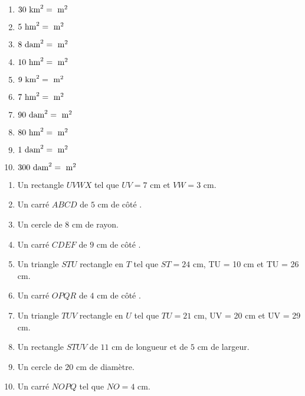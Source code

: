 \documentclass[a4paper,11pt,fleqn]{article}
\begin{document}

\begin{multicols}{2}
\begin{enumerate}[itemsep=2em]
	\item $ 30~\text{km}^2 = \dotfill ~\text{m}^2$
	\item $ 5~\text{hm}^2 = \dotfill ~\text{m}^2$
	\item $ 8~\text{dam}^2 = \dotfill ~\text{m}^2$
	\item $ 10~\text{hm}^2 = \dotfill ~\text{m}^2$
	\item $ 9~\text{km}^2 = \dotfill ~\text{m}^2$
	\item $ 7~\text{hm}^2 = \dotfill ~\text{m}^2$
	\item $ 90~\text{dam}^2 = \dotfill ~\text{m}^2$
	\item $ 80~\text{hm}^2 = \dotfill ~\text{m}^2$
	\item $ 1~\text{dam}^2 = \dotfill ~\text{m}^2$
	\item $ 300~\text{dam}^2 = \dotfill ~\text{m}^2$
\end{enumerate}
\end{multicols}


\begin{multicols}{2}
\begin{enumerate}
	\item Un rectangle $UVWX$ tel que $UV = 7$ cm et $VW = 3$ cm.
	\item Un carré $ABCD$ de $5$ cm de côté .
	\item Un cercle de $8$ cm de rayon.
	\item Un carré $CDEF$ de $9$ cm de côté .
	\item Un triangle $STU$ rectangle en $T$ tel que $ST = 24$ cm, TU = 10 cm et TU = 26 cm.
	\item Un carré $OPQR$ de $4$ cm de côté .
	\item Un triangle $TUV$ rectangle en $U$ tel que $TU = 21$ cm, UV = 20 cm et UV = 29 cm.
	\item Un rectangle $STUV$ de $11$ cm de longueur et de $5$ cm de largeur.
	\item Un cercle de $20$ cm de diamètre.
	\item Un carré $NOPQ$ tel que $NO = 4$ cm.
\end{enumerate}
\end{multicols}
\end{document}
